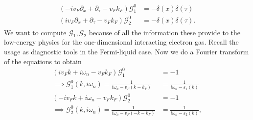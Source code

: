 \begin{align}\label{eq:diff_eq_greens}
\begin{split}
(-iv_F\partial_x + \partial_\tau - v_Fk_F )\mathcal{G}_1^0 &= -\delta(x)\delta(\tau) \\
(iv_F\partial_x + \partial_\tau - v_Fk_F)\mathcal{G}_2^0 &= -\delta(x)\delta(\tau).
\end{split}
\end{align}
We want to compute $\mathcal{G}_1,\mathcal{G}_2$ because of all the information these provide to the low-energy physics for the one-dimensional interacting electron gas. Recall the usage as diagnostic tools in the Fermi-liquid case. Now we do a Fourier transform of the equations to obtain
\begin{align}
\nonumber
(iv_Fk+ i\omega_n- v_Fk_F )\mathcal{G}_1^0&= -1 \\
\implies \mathcal{G}_1^0(k,i\omega_n) = \frac{1}{i\omega_n - v_F(k-k_F)} &= \frac{1}{i\omega_n - \varepsilon_1(k)}\\
\nonumber
(-iv_Fk+ i\omega_n- v_Fk_F )\mathcal{G}_2^0&= -1 \\
\implies \mathcal{G}_2^0(k,i\omega_n) = \frac{1}{i\omega_n - v_F(-k-k_F)} &= \frac{1}{i\omega_n - \varepsilon_2(k)},
\end{align}

